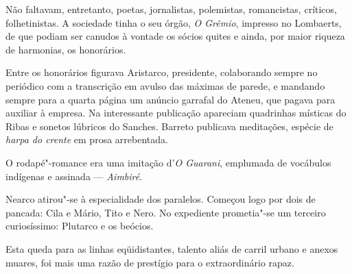 Não faltavam,
entretanto, poetas, jornalistas, polemistas, romancistas, críticos,
folhetinistas. A sociedade tinha o seu órgão, \textit{O Grêmio}, impresso no
Lombaerts, de que podiam ser canudos à vontade os sócios quites e
ainda, por maior riqueza de harmonias, os honorários. 

Entre os
honorários figurava Aristarco, presidente, colaborando sempre no
periódico com a transcrição em avulso das máximas de parede, e mandando
sempre para a quarta página um anúncio garrafal do Ateneu, que pagava
para auxiliar à empresa. Na interessante publicação apareciam
quadrinhas místicas do Ribas e sonetos lúbricos do Sanches. Barreto
publicava meditações, espécie de \textit{harpa do crente} em prosa arrebentada.

O rodapé"-romance era uma imitação d'\textit{O Guarani}, emplumada de vocábulos
indígenas e assinada --- \textit{Aimbiré}. 

Nearco atirou"-se à especialidade dos
paralelos. Começou logo por dois de pancada: Cila e Mário, Tito e Nero.
No expediente prometia"-se um terceiro curiosíssimo: Plutarco e os
beócios. 

Esta queda para as linhas eqüidistantes, talento aliás de
carril urbano e anexos muares, foi mais uma razão de prestígio para o
extraordinário rapaz. 

